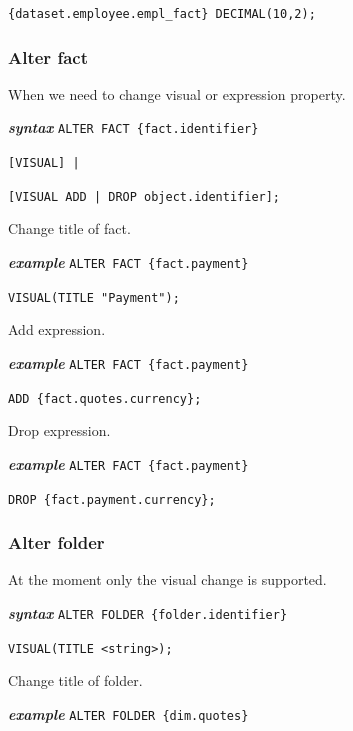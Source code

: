 \documentclass[a4paper, 12pt, titlepage, fleqn]{article}
\begin{document}
\hspace{2.5cm}\verb={dataset.employee.empl_fact} DECIMAL(10,2);=

\subsubsection{Alter fact}
When we need to change visual or expression property.

\textbf{\emph{syntax}}  \hspace{.9cm}\verb=ALTER FACT {fact.identifier}=

\hspace{2.2cm}\verb=[VISUAL] |=

\hspace{2.2cm}\verb=[VISUAL ADD | DROP object.identifier];=

\noindent Change title of fact.

\textbf{\emph{example}}  \hspace{.9cm}\verb=ALTER FACT {fact.payment}=

\hspace{2.5cm}\verb=VISUAL(TITLE "Payment");=

\noindent Add expression.

\textbf{\emph{example}}  \hspace{.9cm}\verb=ALTER FACT {fact.payment}=

\hspace{2.5cm}\verb=ADD {fact.quotes.currency};=

\noindent Drop expression.

\textbf{\emph{example}}  \hspace{.9cm}\verb=ALTER FACT {fact.payment}=

\hspace{2.5cm}\verb=DROP {fact.payment.currency};=

\subsubsection{Alter folder}
At the moment only the visual change is supported.

\textbf{\emph{syntax}}  \hspace{.9cm}\verb=ALTER FOLDER {folder.identifier}=

\hspace{2.2cm}\verb=VISUAL(TITLE <string>);=

\noindent Change title of folder.

\textbf{\emph{example}}  \hspace{.9cm}\verb=ALTER FOLDER {dim.quotes}=
\end{document}
